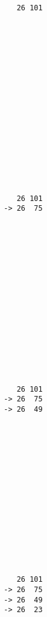 { \begin{verbatim}
                 26 101
              
              
              
              
              
              
              
              
              
              
              
              
              
              
              
              
              
\end{verbatim}}
{ \begin{verbatim}
                 26 101
              -> 26  75
              
              
              
              
              
              
              
              
              
              
              
              
              
              
              
              
\end{verbatim}}
{ \begin{verbatim}
                 26 101
              -> 26  75
              -> 26  49
              
              
              
              
              
              
              
              
              
              
              
              
              
              
              
\end{verbatim}}
{ \begin{verbatim}
                 26 101
              -> 26  75
              -> 26  49
              -> 26  23
              
              
              
              
              
              
              
              
              
              
              
              
              
              
\end{verbatim}}

